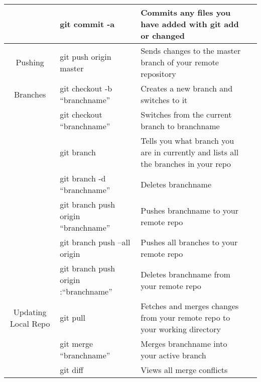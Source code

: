 \documentclass[11pt, letterpaper]{article}
\begin{document}
\begin{table}
\begin{center}
\begin{tabular}{c|l|p{5cm} l}
					& git commit -a & Commits any files you have added with git add or changed \\

					\midrule
					Pushing

					& git push origin master & Sends changes to the master branch of your remote repository \\

					\midrule
					Branches

					& git checkout -b ``branchname'' & Creates a new branch and switches to it \\\cmidrule{2-3}

					& git checkout ``branchname'' & Switches from the current branch to branchname \\\cmidrule{2-3}

					& git branch & Tells you what branch you are in currently and lists all the branches in your repo \\\cmidrule{2-3}

					& git branch -d ``branchname'' & Deletes branchname \\\cmidrule{2-3}

					& git branch push origin ``branchname'' & Pushes branchname to your remote repo \\\cmidrule{2-3}

					& git branch push --all origin & Pushes all branches to your remote repo \\\cmidrule{2-3}

					& git branch push origin :``branchname'' & Deletes branchname from your remote repo \\

					\midrule
					Updating Local Repo

					& git pull & Fetches and merges changes from your remote repo to your working directory \\\cmidrule{2-3}
					
					& git merge ``branchname'' & Merges branchname into your active branch \\\cmidrule{2-3}

					& git diff & Views all merge conflicts \\

					\bottomrule
				\end{tabular}
				\hspace*{-2cm}
			\end{center}
		\end{table}
\end{document}
